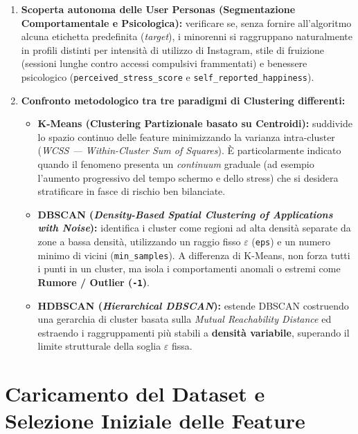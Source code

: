 \begin{enumerate}
    \item \textbf{Scoperta autonoma delle User Personas (Segmentazione Comportamentale e Psicologica):} verificare se, senza fornire all'algoritmo alcuna etichetta predefinita (\emph{target}), i minorenni si raggruppano naturalmente in profili distinti per intensità di utilizzo di Instagram, stile di fruizione (sessioni lunghe contro accessi compulsivi frammentati) e benessere psicologico (\texttt{perceived\_stress\_score} e \texttt{self\_reported\_happiness}).
    \item \textbf{Confronto metodologico tra tre paradigmi di Clustering differenti:}
    \begin{itemize}
        \item \textbf{K-Means (Clustering Partizionale basato su Centroidi):} suddivide lo spazio continuo delle feature minimizzando la varianza intra-cluster (\emph{WCSS --- Within-Cluster Sum of Squares}). È particolarmente indicato quando il fenomeno presenta un \emph{continuum} graduale (ad esempio l'aumento progressivo del tempo schermo e dello stress) che si desidera stratificare in fasce di rischio ben bilanciate.
        \item \textbf{DBSCAN (\emph{Density-Based Spatial Clustering of Applications with Noise}):} identifica i cluster come regioni ad alta densità separate da zone a bassa densità, utilizzando un raggio fisso $\varepsilon$ (\texttt{eps}) e un numero minimo di vicini (\texttt{min\_samples}). A differenza di K-Means, non forza tutti i punti in un cluster, ma isola i comportamenti anomali o estremi come \textbf{Rumore / Outlier (\texttt{-1})}.
        \item \textbf{HDBSCAN (\emph{Hierarchical DBSCAN}):} estende DBSCAN costruendo una gerarchia di cluster basata sulla \emph{Mutual Reachability Distance} ed estraendo i raggruppamenti più stabili a \textbf{densità variabile}, superando il limite strutturale della soglia $\varepsilon$ fissa.
    \end{itemize}
\end{enumerate}

\section{Caricamento del Dataset e Selezione Iniziale delle Feature}
\label{sec:caricamento_feature}

